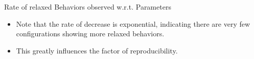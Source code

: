 \documentclass{beamer}
\begin{document}
    \begin{frame}{Rate of relaxed Behaviors observed w.r.t. Parameters}



        \begin{figure}
        \end{figure}

        \begin{itemize}
            \item Note that the rate of decrease is exponential, indicating there are very few configurations showing more relaxed behaviors.
            \item This greatly influences the factor of reproducibility.
        \end{itemize}
        
    \end{frame}
\end{document}
